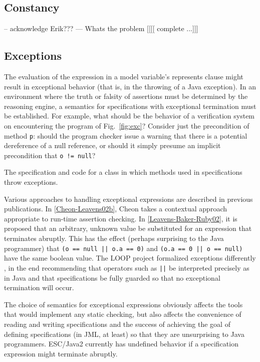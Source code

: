 \documentclass{sig-alternate}
\begin{document}
\subsection{Constancy}

-- acknowledge Erik???
--- Whats the problem
[[[[ complete ...]]]


\subsection{Exceptions}

The evaluation of the expression in a model variable's represents clause might result in
exceptional behavior (that is, in the throwing of a Java exception).  In an environment
where the truth or falsity of assertions must be determined by the reasoning engine, a
semantics for specifications with exceptional termination must be established.  For example,
what should be the behavior of a verification system on encountering the program of 
Fig.~\ref{fig:exc}?  Consider just the precondition of method \texttt{p}: should the program 
checker issue a warning that there is a potential dereference of a null reference, or should it
simply presume an implicit precondition that \texttt{o != null}?

\begin{BFIGURE}

\caption{The specification and code for a class in which methods used in specifications throw exceptions.}
\label{fig:norep}
\end{BFIGURE}

Various approaches to handling exceptional expressions are described in previous 
publications.
In \ref{Cheon-Leavens02b}, Cheon takes a contextual approach appropriate to run-time 
assertion checking.   In \ref{Leavens-Baker-Ruby02}, it is proposed that 
an arbitrary, unknown value be substituted for an expression that terminates abruptly.
This has the effect (perhaps surprising to the Java programmer) that
\texttt{(o == null || o.a == 0)} and \texttt{(o.a == 0 || o == null)} have the same boolean value.
The LOOP project formalized exceptions differently \cite{BergPJ00a}, in the end recommending
that operators such as \texttt{||} be interpreted precisely as in Java and that specifications be
fully guarded so that no exceptional termination will occur.

The choice of semantics for exceptional expressions obviously affects the tools that would
implement any static checking, but also affects the convenience of reading and 
writing specifications and the success of achieving the goal of defining specifications (in JML, 
at least) so that they are unsurprising to Java programmers.  ESC/Java2 currently has
undefined behavior if a specification expression might terminate abruptly.
\end{document}
